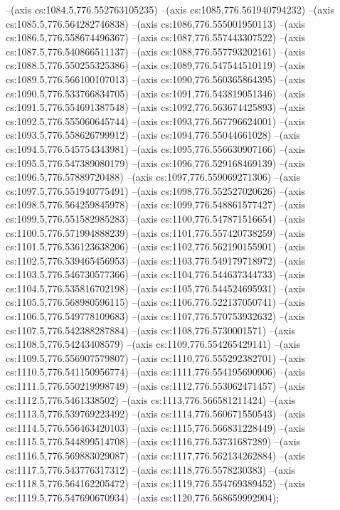 --(axis cs:1084.5,776.552763105235)
--(axis cs:1085,776.561940794232)
--(axis cs:1085.5,776.564282746838)
--(axis cs:1086,776.555001950113)
--(axis cs:1086.5,776.558674496367)
--(axis cs:1087,776.557443307522)
--(axis cs:1087.5,776.540866511137)
--(axis cs:1088,776.557793202161)
--(axis cs:1088.5,776.550255325386)
--(axis cs:1089,776.547544510119)
--(axis cs:1089.5,776.566100107013)
--(axis cs:1090,776.560365864395)
--(axis cs:1090.5,776.533766834705)
--(axis cs:1091,776.543819051346)
--(axis cs:1091.5,776.554691387548)
--(axis cs:1092,776.563674425893)
--(axis cs:1092.5,776.555060645744)
--(axis cs:1093,776.567796624001)
--(axis cs:1093.5,776.558626799912)
--(axis cs:1094,776.55044661028)
--(axis cs:1094.5,776.545754343981)
--(axis cs:1095,776.556630907166)
--(axis cs:1095.5,776.547389080179)
--(axis cs:1096,776.529168469139)
--(axis cs:1096.5,776.57889720488)
--(axis cs:1097,776.559069271306)
--(axis cs:1097.5,776.551940775491)
--(axis cs:1098,776.552527020626)
--(axis cs:1098.5,776.564259845978)
--(axis cs:1099,776.548861577427)
--(axis cs:1099.5,776.551582985283)
--(axis cs:1100,776.547871516654)
--(axis cs:1100.5,776.571994888239)
--(axis cs:1101,776.557420738259)
--(axis cs:1101.5,776.536123638206)
--(axis cs:1102,776.562190155901)
--(axis cs:1102.5,776.539465456953)
--(axis cs:1103,776.549179718972)
--(axis cs:1103.5,776.546730577366)
--(axis cs:1104,776.544637344733)
--(axis cs:1104.5,776.535816702198)
--(axis cs:1105,776.544524695931)
--(axis cs:1105.5,776.568980596115)
--(axis cs:1106,776.522137050741)
--(axis cs:1106.5,776.549778109683)
--(axis cs:1107,776.570753932632)
--(axis cs:1107.5,776.542388287884)
--(axis cs:1108,776.5730001571)
--(axis cs:1108.5,776.54243408579)
--(axis cs:1109,776.554265429141)
--(axis cs:1109.5,776.556907579807)
--(axis cs:1110,776.555292382701)
--(axis cs:1110.5,776.541150956774)
--(axis cs:1111,776.554195690906)
--(axis cs:1111.5,776.550219998749)
--(axis cs:1112,776.553062471457)
--(axis cs:1112.5,776.5461338502)
--(axis cs:1113,776.566581211424)
--(axis cs:1113.5,776.539769223492)
--(axis cs:1114,776.560671550543)
--(axis cs:1114.5,776.556463420103)
--(axis cs:1115,776.566831228449)
--(axis cs:1115.5,776.544899514708)
--(axis cs:1116,776.53731687289)
--(axis cs:1116.5,776.569883029087)
--(axis cs:1117,776.562134262884)
--(axis cs:1117.5,776.543776317312)
--(axis cs:1118,776.5578230383)
--(axis cs:1118.5,776.564162205472)
--(axis cs:1119,776.554769389452)
--(axis cs:1119.5,776.547690670934)
--(axis cs:1120,776.568659992904);


